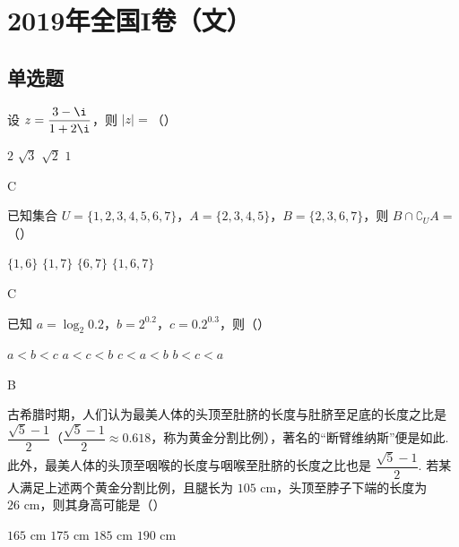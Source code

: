 \chapter{2019年全国I卷（文）}

\section{单选题}

\begin{problem}
设 \( z=\dfrac{3-\i}{1+2\i} \)，则 \( |z|=\)（\quad）

\choices
    {\( 2 \)}
    {\( \sqrt3 \)}
    {\( \sqrt2 \)}
    {\( 1 \)}
\end{problem}

\begin{answer}
C
\end{answer}

\begin{problem}
已知集合 \( U=\{1,2,3,4,5,6,7\} \)，\( A=\{2,3,4,5\} \)，\( B=\{2,3,6,7\} \)，则 \( B\cap \complement_U A=\)（\quad）

\choices
    {\( \{1,6\} \)}
    {\( \{1,7\} \)}
    {\( \{6,7\} \)}
    {\( \{1,6,7\} \)}
\end{problem}

\begin{answer}
C
\end{answer}

\begin{problem}
已知 \( a=\log_2 0.2 \)，\( b=2^{0.2} \)，\( c=0.2^{0.3} \)，则（\quad）

\choices
    {\( a<b<c \)}
    {\( a<c<b \)}
    {\( c<a<b \)}
    {\( b<c<a \)}
\end{problem}

\begin{answer}
B
\end{answer}

\begin{problem}
古希腊时期，人们认为最美人体的头顶至肚脐的长度与肚脐至足底的长度之比是 \( \dfrac{\sqrt5-1}{2} \)（\( \dfrac{\sqrt5-1}{2}\approx 0.618 \)，称为黄金分割比例），著名的“断臂维纳斯”便是如此. 此外，最美人体的头顶至咽喉的长度与咽喉至肚脐的长度之比也是 \( \dfrac{\sqrt5-1}{2} \). 若某人满足上述两个黄金分割比例，且腿长为 \( 105\text{ cm} \)，头顶至脖子下端的长度为 \( 26\text{ cm} \)，则其身高可能是（\quad）


\choices
    {\( 165\text{ cm} \)}
    {\( 175\text{ cm} \)}
    {\( 185\text{ cm} \)}
    {\( 190\text{ cm} \)}
\end{problem}

